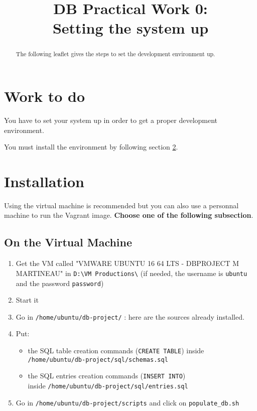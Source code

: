 \documentclass[twoside,a4paper,12pt]{article}
\title{DB Practical Work 0:\\Setting the system up}
\date{}
\begin{document}
\maketitle

\begin{abstract}
  The following leaflet gives the steps to set the development environment up.
\end{abstract}

\tableofcontents

\clearpage

\section{Work to do}
You have to set your system up in order to get a proper development environment.

You must install the environment by following section \ref{sec:installation}.

\section{Installation}
\label{sec:installation}

Using the virtual machine is recommended but you can also use a personnal machine to run the Vagrant image. \textbf{Choose one of the following subsection}.

\newpage
\subsection{On the Virtual Machine}
\begin{enumerate}
\item Get the VM called "VMWARE UBUNTU 16 64 LTS - DBPROJECT M MARTINEAU" in \texttt{D:\textbackslash VM Productions\textbackslash} (if needed, the username is \texttt{ubuntu} and the password \texttt{password})
\item Start it
\item Go in \texttt{/home/ubuntu/db-project/} : here are the sources already installed.
\item Put:
\begin{itemize}
	\item the SQL table creation commands (\texttt{CREATE TABLE}) inside\\ \texttt{/home/ubuntu/db-project/sql/schemas.sql}
	\item the SQL entries creation commands (\texttt{INSERT INTO})\\ inside \texttt{/home/ubuntu/db-project/sql/entries.sql}
\end{itemize}
\item Go in \texttt{/home/ubuntu/db-project/scripts} and click on \texttt{populate\_db.sh}
\end{enumerate}
\end{document}
